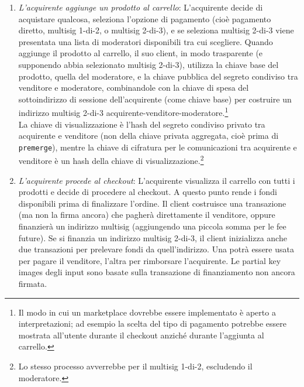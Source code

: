 \begin{enumerate}
\begin{enumerate}
        \item {\em L'acquirente aggiunge un prodotto al carrello}: L'acquirente decide di acquistare qualcosa, seleziona l'opzione di pagamento (cioè pagamento diretto, multisig 1-di-2, o multisig 2-di-3), e se seleziona multisig 2-di-3 viene presentata una lista di moderatori disponibili tra cui scegliere. Quando aggiunge il prodotto al carrello, il suo client, in modo trasparente (e supponendo abbia selezionato multisig 2-di-3), utilizza la chiave base del prodotto, quella del moderatore, e la chiave pubblica del segreto condiviso tra venditore e moderatore, combinandole con la chiave di spesa del sottoindirizzo di sessione dell'acquirente (come chiave base) per costruire un indirizzo multisig 2-di-3 acquirente-venditore-moderatore.\footnote{Il modo in cui un marketplace dovrebbe essere implementato è aperto a interpretazioni; ad esempio la scelta del tipo di pagamento potrebbe essere mostrata all'utente durante il checkout anziché durante l'aggiunta al carrello.} \\

        La chiave di visualizzazione è l'hash del segreto condiviso privato tra acquirente e venditore (non della chiave privata aggregata, cioè prima di {\tt premerge}), mentre la chiave di cifratura per le comunicazioni tra acquirente e venditore è un hash della chiave di visualizzazione.\footnote{Lo stesso processo avverrebbe per il multisig 1-di-2, escludendo il moderatore.}
        \item {\em L'acquirente procede al checkout}: L'acquirente visualizza il carrello con tutti i prodotti e decide di procedere al checkout. A questo punto rende i fondi disponibili prima di finalizzare l'ordine. Il client costruisce una transazione (ma non la firma ancora) che pagherà direttamente il venditore, oppure finanzierà un indirizzo multisig (aggiungendo una piccola somma per le fee future). Se si finanzia un indirizzo multisig 2-di-3, il client inizializza anche due transazioni per prelevare fondi da quell'indirizzo. Una potrà essere usata per pagare il venditore, l'altra per rimborsare l'acquirente. Le partial key images degli input sono basate sulla transazione di finanziamento non ancora firmata. \\
        

\end{enumerate}
\end{enumerate}

